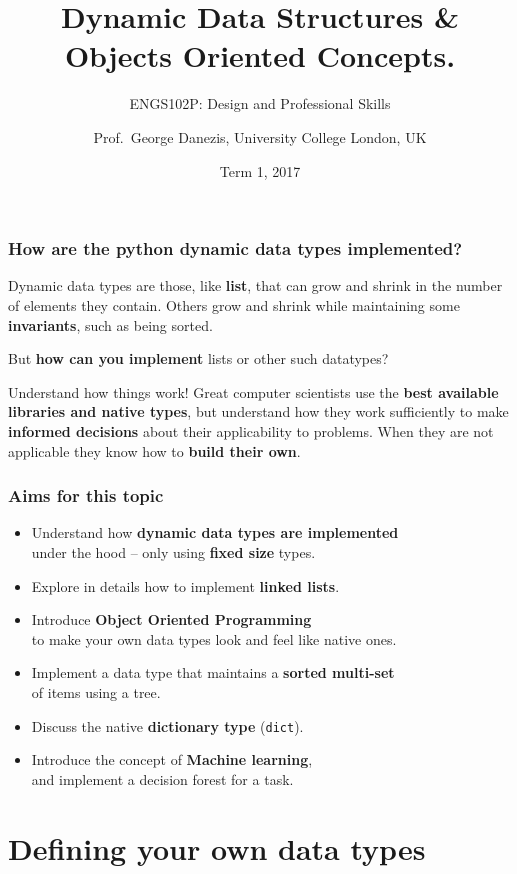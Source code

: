\documentclass{beamer} %
\author{Prof.\ George Danezis, University College London, UK}
\title{Dynamic Data Structures \& Objects Oriented Concepts.}
\subtitle{ENGS102P: Design and Professional Skills }
\date{Term 1, 2017}
\newcommand\emc[1]{\textcolor{brightblue}{\textbf{#1}}}
\begin{document}
\nobibliography*


\frame{
\titlepage
}

\begin{frame}
\frametitle{How are the python dynamic data types implemented?}

Dynamic data types are those, like \emc{list}, that can grow and shrink in the number of elements they contain. Others grow and shrink while maintaining some \emc{invariants}, such as being sorted.

\vspace{3mm}
But \emc{how can you implement} lists or other such datatypes?

\vspace{3mm}
\begin{block}{Understand how things work!}
Great computer scientists use the \emc{best available libraries and native types}, but understand how they work sufficiently to make \emc{informed decisions} about their applicability to problems. When they are not applicable they know how to \emc{build their own}.
\end{block}

\end{frame}

\begin{frame}
\frametitle{Aims for this topic}

\begin{itemize}
	\item Understand how \emc{dynamic data types are implemented} \\ under the hood -- only using \emc{fixed size} types.
	\item Explore in details how to implement \emc{linked lists}.
	\item Introduce \emc{Object Oriented Programming} \\ to make your own data types look and feel like native ones.
	\item Implement a data type that maintains a \emc{sorted multi-set} \\ of items using a tree.
	\item Discuss the native \emc{dictionary type} (\texttt{dict}).
	\item Introduce the concept of \emc{Machine learning}, \\ and implement a decision forest for a task.
\end{itemize}

\end{frame}


\section{Defining your own data types}
\end{document}

